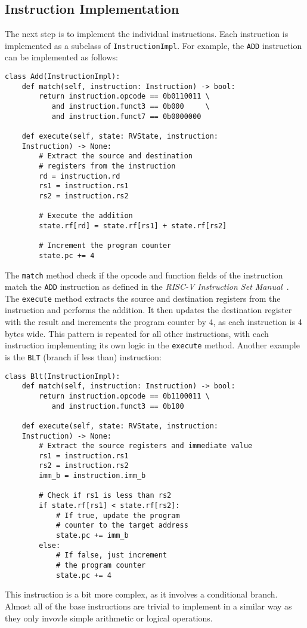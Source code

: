 \documentclass[sigconf]{acmart}
\begin{document}
\subsection{Instruction Implementation}
The next step is to implement the individual instructions. Each instruction is implemented as a subclass of \texttt{InstructionImpl}.
For example, the \texttt{ADD} instruction can be implemented as follows:
\begin{verbatim}
class Add(InstructionImpl):
    def match(self, instruction: Instruction) -> bool:
        return instruction.opcode == 0b0110011 \
           and instruction.funct3 == 0b000     \
           and instruction.funct7 == 0b0000000
    
    def execute(self, state: RVState, instruction: 
    Instruction) -> None:
        # Extract the source and destination 
        # registers from the instruction
        rd = instruction.rd
        rs1 = instruction.rs1
        rs2 = instruction.rs2

        # Execute the addition
        state.rf[rd] = state.rf[rs1] + state.rf[rs2]

        # Increment the program counter
        state.pc += 4
\end{verbatim}
The \texttt{match} method check if the opcode and function fields of the instruction match the \texttt{ADD} instruction as defined in the \textit{RISC-V Instruction Set Manual}~\cite{riscv-spec}.
The \texttt{execute} method extracts the source and destination registers from the instruction and performs the addition. It then updates the destination register with the result and increments the program counter by 4, as each instruction is 4 bytes wide.
This pattern is repeated for all other instructions, with each instruction implementing its own logic in the \texttt{execute} method.
Another example is the \texttt{BLT} (branch if less than) instruction:
\begin{verbatim}
class Blt(InstructionImpl):
    def match(self, instruction: Instruction) -> bool:
        return instruction.opcode == 0b1100011 \
           and instruction.funct3 == 0b100
    
    def execute(self, state: RVState, instruction: 
    Instruction) -> None:
        # Extract the source registers and immediate value
        rs1 = instruction.rs1
        rs2 = instruction.rs2
        imm_b = instruction.imm_b

        # Check if rs1 is less than rs2
        if state.rf[rs1] < state.rf[rs2]:
            # If true, update the program 
            # counter to the target address
            state.pc += imm_b
        else:
            # If false, just increment 
            # the program counter
            state.pc += 4
\end{verbatim}
This instruction is a bit more complex, as it involves a conditional branch. 
Almost all of the base instructions are trivial to implement in a similar way as they only invovle simple arithmetic or logical operations.
\end{document}
